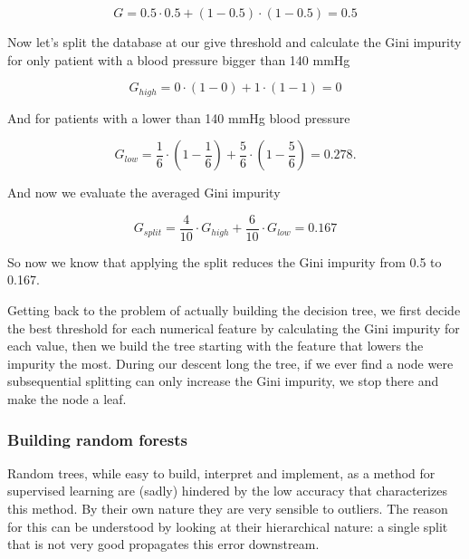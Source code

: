 \documentclass[a4paper]{report}
\begin{document}
\begin{equation}
    G = 0.5 \cdot 0.5 + (1-0.5) \cdot (1-0.5) = 0.5
\end{equation}

Now let's split the database at our give threshold and calculate the Gini impurity for only patient with a blood pressure bigger than 140 mmHg

\begin{equation}
    G_{high} = 0 \cdot (1 -0) + 1 \cdot (1-1) = 0
\end{equation}

And for patients with a lower than 140 mmHg blood pressure

\begin{equation}
    G_{low} = \frac{1}{6} \cdot (1 - \frac{1}{6}) + \frac{5}{6} \cdot (1- \frac{5}{6}) = 0.278.
\end{equation}

And now we evaluate the averaged Gini impurity

\begin{equation}
    G_{split} = \frac{4}{10} \cdot G_{high} + \frac{6}{10} \cdot G_{low} = 0.167
\end{equation}

So now we know that applying the split reduces the Gini impurity from 0.5 to 0.167.

Getting back to the problem of actually building the decision tree, we first decide the best threshold for each numerical feature by calculating the Gini impurity for each value, then we build the tree starting with the feature that lowers the impurity the most.
During our descent long the tree, if we ever find a node were subsequential splitting can only increase the Gini impurity, we stop there and make the node a leaf.

\subsubsection{Building random forests}
Random trees, while easy to build, interpret and implement, as a method for supervised learning are (sadly) hindered by the low accuracy that characterizes this method.
By their own nature they are very sensible to outliers. The reason for this can be understood by looking at their hierarchical nature: a single split that is not very good propagates this error downstream.
\end{document}
